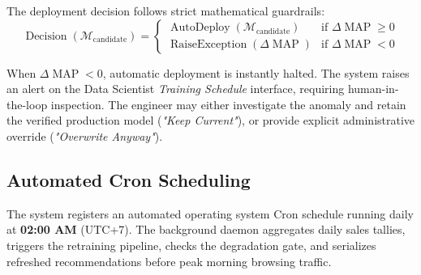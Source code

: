 The deployment decision follows strict mathematical guardrails:
\begin{equation}
    \operatorname{Decision}(\mathcal{M}_{\text{candidate}}) = 
    \begin{cases} 
        \operatorname{AutoDeploy}(\mathcal{M}_{\text{candidate}}) & \text{if } \Delta \operatorname{MAP} \ge 0 \\ 
        \operatorname{RaiseException}(\Delta \operatorname{MAP}) & \text{if } \Delta \operatorname{MAP} < 0 
    \end{cases}
\end{equation}

When $\Delta \operatorname{MAP} < 0$, automatic deployment is instantly halted. The system raises an alert on the Data Scientist \textit{Training Schedule} interface, requiring human-in-the-loop inspection. The engineer may either investigate the anomaly and retain the verified production model (\textit{"Keep Current"}), or provide explicit administrative override (\textit{"Overwrite Anyway"}).

\subsection{Automated Cron Scheduling}
The system registers an automated operating system Cron schedule running daily at \textbf{02:00 AM} (UTC+7). The background daemon aggregates daily sales tallies, triggers the retraining pipeline, checks the degradation gate, and serializes refreshed recommendations before peak morning browsing traffic.
